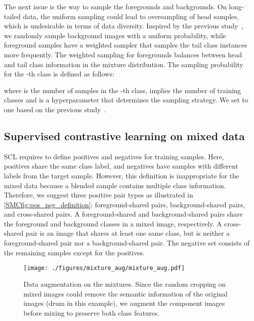 \documentclass[10pt,twocolumn,letterpaper]{article}
\begin{document}
The next issue is the way to sample the foregrounds and backgrounds. On long-tailed data, the uniform sampling could lead to oversampling of head samples, which is undesirable in terms of data diversity.
Inspired by the previous study~\cite{CMO}, we randomly sample background images with a uniform probability, while foreground samples have a weighted sampler that samples the tail class instances more frequently. The weighted sampling for foregrounds balances between head and tail class information in the mixture distribution. The sampling probability for the -th class is defined as follows:

where  is the number of samples in the -th class,  implies the number of training classes and  is a hyperparameter that determines the sampling strategy. We set  to one based on the previous study~\cite{CMO}.







\subsection{Supervised contrastive learning on mixed data}
SCL requires to define positives and negatives for training samples. Here, positives share the same class label, and negatives have samples with different labels from the target sample.
However, this definition is inappropriate for the mixed data because a blended sample contains multiple class information.
Therefore, we suggest three positive pair types as illustrated in \cref{SMCfig:pos_neg_definition}: foreground-shared pairs, background-shared pairs, and cross-shared pairs.
A foreground-shared and background-shared pairs share the foreground and background classes in a mixed image, respectively.
A cross-shared pair is an image that shares at least one same class, but is neither a foreground-shared pair nor a background-shared pair.
The negative set consists of the remaining samples except for the positives.

\begin{figure}[t]
    \centering
    \texttt{[image: ./figures/mixture\_aug/mixture\_aug.pdf]}
    \caption{Data augmentation on the mixtures. Since the random cropping on mixed images could remove the semantic information of the original images (drum in this example), we augment the component images before mixing to preserve both class features.}
    \label{SMCfig:mixture_augmentation}
\end{figure}
\end{document}
